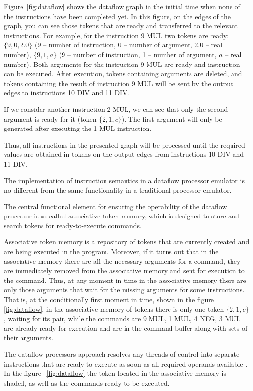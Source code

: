 \documentclass[
11pt,%
tightenlines,%
twoside,%
onecolumn,%
nofloats,%
nobibnotes,%
nofootinbib,%
superscriptaddress,%
noshowpacs,%
centertags]%
{revtex4}
\begin{document}
Figure~\ref{fig:dataflow} shows the dataflow graph in the initial time when none of the instructions have been completed yet.
In this figure, on the edges of the graph, you can see those tokens that are ready and transferred to the relevant instructions.
For example, for the instruction 9 MUL two tokens are ready: $\{9, 0, 2.0\}$ (9 -- number of instruction, 0 -- number of argument, 2.0 -- real number), $\{9, 1, a\}$ (9 -- number of instruction, 1 -- number of argument, $a$ -- real number).
Both arguments for the instruction 9 MUL are ready and instruction can be executed.
After execution, tokens containing arguments are deleted, and tokens containing the result of instruction 9 MUL will be sent by the output edges to instructions 10 DIV and 11 DIV.

If we consider another instruction 2 MUL, we can see that only the second argument is ready for it (token $\{2, 1, c\}$).
The first argument will only be generated after executing the 1 MUL instruction.

Thus, all instructions in the presented graph will be processed until the required values are obtained in tokens on the output edges from instructions 10 DIV and 11 DIV.

The implementation of instruction semantics in a dataflow processor emulator is no different from the same functionality in a traditional processor emulator.

The central functional element for ensuring the operability of the dataflow processor is so-called associative token memory, which is designed to store and search tokens for ready-to-execute commands.

Associative token memory is a repository of tokens that are currently created and are being executed in the program.
Moreover, if it turns out that in the associative memory there are all the necessary arguments for a command, they are immediately removed from the associative memory and sent for execution to the command.
Thus, at any moment in time in the associative memory there are only those arguments that wait for the missing arguments for some instructions.
That is, at the conditionally first moment in time, shown in the figure~ \ref{fig:dataflow}, in the associative memory of tokens there is only one token $\{2, 1, c\}$, waiting for its pair, while the commands are 9 MUL, 1 MUL, 4 NEG, 3 MUL are already ready for execution and are in the command buffer along with sets of their arguments.

The dataflow processors approach resolves any threads of control into separate instructions that are ready to execute as soon as all required operands available \cite{silc}. 
In the figure ~\ref{fig:dataflow} the token located in the associative memory is shaded, as well as the commands ready to be executed.
\end{document}
